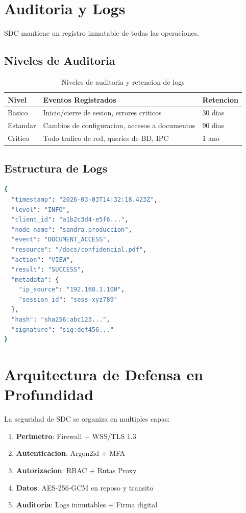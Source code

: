 \section{Auditoria y Logs}
\label{sec:auditoria}

SDC mantiene un registro inmutable de todas las operaciones.

\subsection{Niveles de Auditoria}

\begin{table}[H]
\centering
\begin{tabular}{p{3cm}p{4cm}p{6cm}}
\toprule
\textbf{Nivel} & \textbf{Eventos Registrados} & \textbf{Retencion} \\
\midrule
Basico & Inicio/cierre de sesion, errores criticos & 30 dias \\
\midrule
Estandar & Cambios de configuracion, accesos a documentos & 90 dias \\
\midrule
Critico & Todo trafico de red, queries de BD, IPC & 1 ano \\
\bottomrule
\end{tabular}
\caption{Niveles de auditoria y retencion de logs}
\label{tab:niveles-auditoria}
\end{table}

\subsection{Estructura de Logs}

\begin{lstlisting}[language=bash, caption={Formato de Log de Auditoria}]
{
  "timestamp": "2026-03-03T14:32:18.423Z",
  "level": "INFO",
  "client_id": "a1b2c3d4-e5f6...",
  "node_name": "sandra.produccion",
  "event": "DOCUMENT_ACCESS",
  "resource": "/docs/confidencial.pdf",
  "action": "VIEW",
  "result": "SUCCESS",
  "metadata": {
    "ip_source": "192.168.1.100",
    "session_id": "sess-xyz789"
  },
  "hash": "sha256:abc123...",
  "signature": "sig:def456..."
}
\end{lstlisting}

\section{Arquitectura de Defensa en Profundidad}

La seguridad de SDC se organiza en multiples capas:

\begin{enumerate}
    \item \textbf{Perimetro}: Firewall + WSS/TLS 1.3
    \item \textbf{Autenticacion}: Argon2id + MFA
    \item \textbf{Autorizacion}: RBAC + Rutas Proxy
    \item \textbf{Datos}: AES-256-GCM en reposo y transito
    \item \textbf{Auditoria}: Logs inmutables + Firma digital
\end{enumerate}
